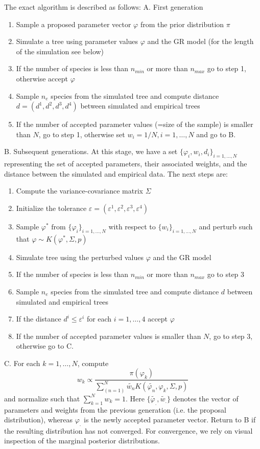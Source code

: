 The exact algorithm is described as follows:
A. First generation
\begin{enumerate} 
	\item Sample a proposed parameter vector $\varphi$ from the prior distribution $\pi$
	\item Simulate a tree using parameter values $\varphi$ and the GR model (for the length of the simulation see below)
	\item If the number of species is less than $n_{min}$  or more than $n_{max}$ go to step 1, otherwise accept $\varphi$
	\item Sample $n_e$  species from the simulated tree and compute distance $d=(d^1,d^2,d^3,d^4)$ between simulated and empirical trees
	\item If the number of accepted parameter values (=size of the sample) is smaller than $N$, go to step 1, otherwise set $w_i=1/N ,i=1, \ldots ,N$ and go to B. \newline
\end{enumerate}
%
B. Subsequent generations. 
At this stage, we have a set  $ \{\varphi_i,w_i,d_i\}_{i=1,\ldots,N}$ representing the set of accepted parameters, their associated weights, and the distance between the simulated and empirical data.  
The next steps are:
\begin{enumerate} 
	\item Compute the variance-covariance matrix $\Sigma$ 
	\item Initialize the tolerance $\varepsilon=(\varepsilon^1,\varepsilon^2,\varepsilon^3,\varepsilon^4)$
	\item Sample $\varphi^* \mbox{ from } \{\varphi_i\}_{i=1,\ldots,N}$ with respect to $\{w_i \}_{i=1,\ldots,N}$  and perturb such that $\varphi \sim K(\varphi^*,\Sigma,p)$
	\item Simulate tree using the perturbed values $\varphi$ and the GR model
	\item If the number of species is less than $n_{min}$ or more than $n_{max}$ go to step 3
	\item Sample $n_e$ species from the simulated tree and compute distance $d$ between simulated and empirical trees
	\item If the distance $d^i \leq \varepsilon^i$ for each $i=1,\ldots,4$ accept $\varphi$ 
	\item If the number of accepted parameter values is smaller than $N$, go to step 3, otherwise go to C.
\end{enumerate}
C. For each $k=1,\ldots,N$, compute 
\[
	w_k  \propto \frac{ \pi (\varphi_k)}{\sum_{(n=1)}^N \tilde{w_n}  K( \tilde{\varphi_n}, \varphi_k,\Sigma,p)}
\]
and normalize such that  $\sum_{k = 1}^N w_k=1$. 
Here $\{\tilde{\varphi_.},\tilde{w_.}\}$ denotes the vector of parameters and weights from the previous generation (i.e. the proposal distribution), whereas $\varphi_.$ is the newly accepted parameter vector. 
Return to B if the resulting distribution has not converged. 
For convergence, we rely on visual inspection of the marginal posterior distributions.

